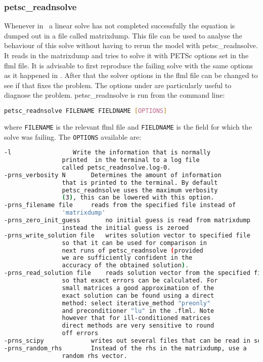 
\subsubsection{petsc\_readnsolve}
\label{sect:petsc_readnsolve} 
Whenever in \fluidity\ a linear solve has not completed successfully the equation is dumped out in a file called matrixdump. This file can be used to analyse the behaviour of this solve without having to rerun the model with petsc\_readnsolve. It reads in the matrixdump and tries to solve it with PETSc options set in the flml file. It is advisable to first reproduce the failing solve with the same options as it happened in \fluidity. After that the solver options in the flml file can be changed to see if that fixes the problem. The options under  are particularly useful to diagnose the problem.  petsc\_readnsolve is run from the command line:

\begin{lstlisting}[language = Bash]
petsc_readnsolve FILENAME FIELDNAME [OPTIONS]
\end{lstlisting}
where \lstinline[language = Bash]+FILENAME+ is the relevant flml file and \lstinline[language = Bash]+FIELDNAME+ is the field for which the solve was failing. The \lstinline[language = Bash]+OPTIONS+ available are:
\begin{lstlisting}[language = Bash]
 -l 	 			Write the information that is normally
				printed  in the terminal to a log file 
				called petsc_readnsolve.log-0.
-prns_verbosity N 	 	Determines the amount of information 
				that is printed to the terminal. By default 
				petsc_readnsolve uses the maximum verbosity 
				(3), this can be lowered with this option. 
-prns_filename file		reads from the specified file instead of 
				'matrixdump'
-prns_zero_init_guess 		no initial guess is read from matrixdump 
				instead the initial guess is zeroed
-prns_write_solution file 	writes solution vector to specified file 
				so that it can be used for comparison in 
				next runs of petsc_readnsolve (provided 
				we are sufficiently confident in the 
				accuracy of the obtained solution).
-prns_read_solution file 	reads solution vector from the specified file,
				so that exact errors can be calculated. For 
				small matrices a good approximation of the  
				exact solution can be found using a direct 
				method: select iterative_method "preonly" 
				and preconditioner "lu" in the .flml. Note 
				however that for ill-conditioned matrices 
				direct methods are very sensitive to round 
				off errors
-prns_scipy 			writes out several files that can be read in scipy.
-prns_random_rhs 	 	Instead of the rhs in the matrixdump, use a 
				random rhs vector.
\end{lstlisting} 

